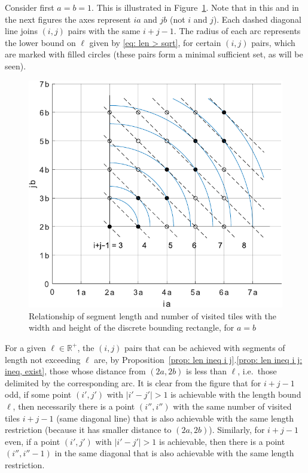 \documentclass[12pt, a4paper]{article}
\newcommand{\len}{\ell} %
\newcommand{\mss}{M}
\begin{document}

Consider first $a=b=1$. This is illustrated in Figure~\ref{fig: ijLS_1}. Note that in this and in the next figures the axes represent $ia$ and $jb$ (not $i$ and $j$). Each dashed diagonal line joins $(i, j)$ pairs with the same $i+j-1$. The radius of each arc represents the lower bound on $\len$ given by \eqref{eq: len > sqrt}, for certain $(i,j)$ pairs, which are marked with filled circles (these pairs form a minimal sufficient set, as will be seen).

\begin{figure}
\centering%
\includegraphics[width=.7\textwidth]{ijLS_1}%
\caption{Relationship of segment length and number of visited tiles with the width and height of the discrete bounding rectangle, for $a=b$
}%
\label{fig: ijLS_1}%
\end{figure}%

For a given $\len \in \mathbb R^+$, the $(i,j)$ pairs that can be achieved with segments of length not exceeding $\len$ are, by Proposition~\ref{prop: len ineq i j}.\ref{prop: len ineq i j: ineq, exist}, those whose distance from $(2a,2b)$ is less than $\len$, i.e.~those delimited by the corresponding arc. It is clear from the figure that for $i+j-1$ odd, if some point $(i',j')$ with $|i'-j'|>1$ is achievable with the length bound $\len$, then necessarily there is a point $(i'',i'')$ with the same number of visited tiles $i+j-1$ (same diagonal line) that is also achievable with the same length restriction (because it has smaller distance to $(2a,2b)$). Similarly, for $i+j-1$ even, if a point $(i',j')$ with $|i'-j'|>1$ is achievable, then there is a point $(i'',i''-1)$ in the same diagonal that is also achievable with the same length restriction.
\end{document}
